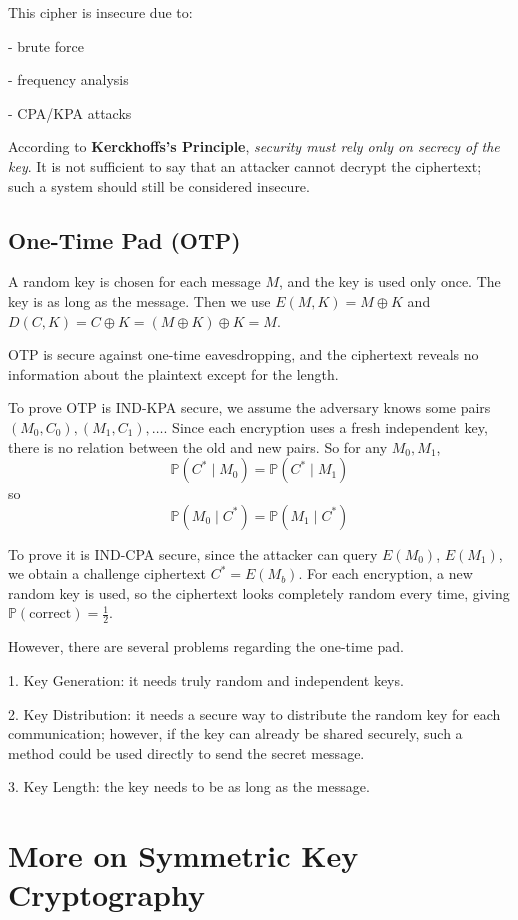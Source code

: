 This cipher is insecure due to:

- brute force

- frequency analysis

- CPA/KPA attacks

According to \textbf{Kerckhoffs's Principle}, \textit{security must rely only on secrecy of the key}. It is not sufficient to say that an attacker cannot decrypt the ciphertext; such a system should still be considered insecure. 

\subsection{One-Time Pad (OTP)}
A random key is chosen for each message \(M\), and the key is used only once. The key is as long as the message. Then we use \(E(M, K) = M \oplus K\) and \(D(C, K) = C \oplus K = (M \oplus K) \oplus K = M\).

OTP is secure against one-time eavesdropping, and the ciphertext reveals no information about the plaintext except for the length.

To prove OTP is IND-KPA secure, we assume the adversary knows some pairs \((M_0, C_0), (M_1, C_1), \dots\). Since each encryption uses a fresh independent key, there is no relation between the old and new pairs. So for any \(M_0, M_1\),
\[
  \mathbb{P} (C^* \mid M_0) = \mathbb{P} (C^* \mid M_1)
\]
so
\[
  \mathbb{P} (M_0 \mid C^*) = \mathbb{P} (M_1 \mid C^*)
\]

To prove it is IND-CPA secure, since the attacker can query \(E(M_0)\), \(E(M_1)\), we obtain a challenge ciphertext \(C^* = E(M_b)\). For each encryption, a new random key is used, so the ciphertext looks completely random every time, giving \(\mathbb{P}(\text{correct}) = \frac{1}{2}\).

However, there are several problems regarding the one-time pad.

1. Key Generation: it needs truly random and independent keys.

2. Key Distribution: it needs a secure way to distribute the random key for each communication; however, if the key can already be shared securely, such a method could be used directly to send the secret message.

3. Key Length: the key needs to be as long as the message.

\section{More on Symmetric Key Cryptography}

